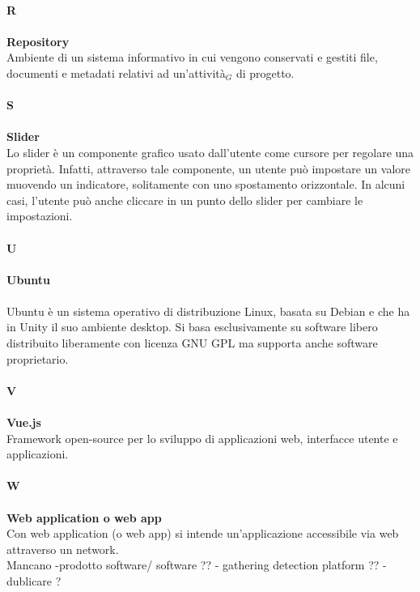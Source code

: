 \\
\textbf{R} \\
\\
\textbf{Repository} \\
Ambiente di un sistema informativo in cui vengono conservati e gestiti file, documenti e metadati relativi ad un’attività$_G$ di progetto. \\
\\
\textbf{S} \\
\\
\textbf{Slider} \\
Lo slider è un componente grafico usato dall'utente come cursore per regolare una proprietà. Infatti, attraverso tale componente, un utente può impostare un valore muovendo un indicatore, solitamente con uno spostamento orizzontale. In alcuni casi, l'utente può anche cliccare in un punto dello slider per cambiare le impostazioni.  \\
\\
\textbf{U} \\
\\
\textbf{Ubuntu} \\
\\
Ubuntu è un sistema operativo di distribuzione Linux, basata su Debian e che ha in Unity il suo ambiente desktop. Si basa esclusivamente su software libero distribuito liberamente con licenza GNU GPL ma supporta anche software proprietario. \\
\\
\textbf{V}\\
\\
\textbf{Vue.js}\\
 Framework open-source per lo sviluppo di applicazioni web, interfacce utente e applicazioni. \\
\\
\textbf{W} \\
\\
\textbf{Web application o web app}\\
Con web application (o web app) si intende un'applicazione accessibile via web attraverso un network. 
\\
 
 
 Mancano 
 -prodotto software/ software ??
 - gathering detection platform ?? 
 - dublicare ?